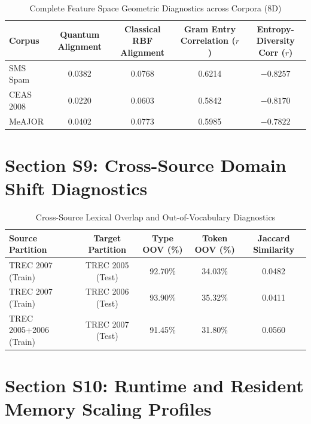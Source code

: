 \documentclass[10pt,letterpaper]{article}
\begin{document}
\begin{table}[h!]
\centering
\small
\caption{Complete Feature Space Geometric Diagnostics across Corpora (8D)}
\label{tab:supp_geometry_table}
\begin{tabular}{lcccc}
\toprule
\textbf{Corpus} & \textbf{Quantum Alignment} & \textbf{Classical RBF Alignment} & \textbf{Gram Entry Correlation ($r$)} & \textbf{Entropy-Diversity Corr ($r$)} \\
\midrule
SMS Spam & 0.0382 & 0.0768 & 0.6214 & $-0.8257$ \\
CEAS 2008 & 0.0220 & 0.0603 & 0.5842 & $-0.8170$ \\
MeAJOR & 0.0402 & 0.0773 & 0.5985 & $-0.7822$ \\
\bottomrule
\end{tabular}
\end{table}

\section{Section S9: Cross-Source Domain Shift Diagnostics}
\label{sec:supp_oov}

\begin{table}[h!]
\centering
\small
\caption{Cross-Source Lexical Overlap and Out-of-Vocabulary Diagnostics}
\label{tab:supp_oov_table}
\begin{tabular}{lcccc}
\toprule
\textbf{Source Partition} & \textbf{Target Partition} & \textbf{Type OOV (\%)} & \textbf{Token OOV (\%)} & \textbf{Jaccard Similarity} \\
\midrule
TREC 2007 (Train) & TREC 2005 (Test) & 92.70\% & 34.03\% & 0.0482 \\
TREC 2007 (Train) & TREC 2006 (Test) & 93.90\% & 35.32\% & 0.0411 \\
TREC 2005+2006 (Train) & TREC 2007 (Test) & 91.45\% & 31.80\% & 0.0560 \\
\bottomrule
\end{tabular}
\end{table}

\section{Section S10: Runtime and Resident Memory Scaling Profiles}
\label{sec:supp_runtime}
\end{document}

